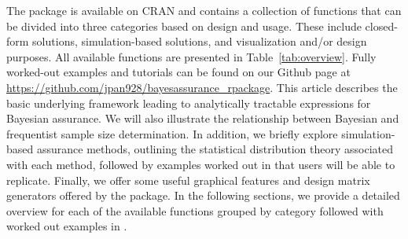 The  package is available on CRAN \citep{bayesassurance} and contains a collection of functions that can be divided into three categories based on design and usage. These include closed-form solutions, simulation-based solutions, and visualization and/or design purposes. All available functions are presented in Table~\ref{tab:overview}.
Fully worked-out examples and tutorials can be found on our Github page at  \href{https://github.com/jpan928/bayesassurance_rpackage}{https://github.com/jpan928/bayesassurance\_rpackage}. This article describes the basic underlying framework leading to analytically tractable expressions for Bayesian assurance. We will also illustrate the relationship between Bayesian and frequentist sample size determination.
In addition, we briefly explore simulation-based assurance methods, outlining the statistical distribution theory associated with each method, followed by examples worked out in  that users will be able to replicate. 
Finally, we offer some useful graphical features and design matrix generators offered by the package. In the following sections, we provide a detailed overview for each of the available functions grouped  by category followed with worked out examples in . 




